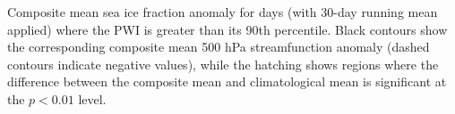 \label{fig:sic_composite}
Composite mean sea ice fraction anomaly for days (with 30-day running mean applied) where the PWI is greater than its 90th percentile. Black contours show the corresponding composite mean 500 hPa streamfunction anomaly (dashed contours indicate negative values), while the hatching shows regions where the difference between the composite mean and climatological mean is significant at the $p < 0.01$ level.
